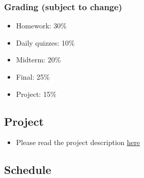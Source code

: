 \documentclass[
]{article}
\providecommand{\tightlist}{%
  \setlength{\itemsep}{0pt}\setlength{\parskip}{0pt}}
\begin{document}
\subsubsection*{Grading (subject to change)}\label{grading-subject-to-change}

\begin{itemize}
\tightlist
\item
  Homework: 30\%
\item
  Daily quizzes: 10\%
\item
  Midterm: 20\%
\item
  Final: 25\%
\item
  Project: 15\%
\end{itemize}

\subsection*{Project}\label{project}

\begin{itemize}
\tightlist
\item
  Please read the project description \href{docs/project-description-ideas.pdf}{here}
\end{itemize}

\subsection*{Schedule}\label{schedule}
\end{document}
